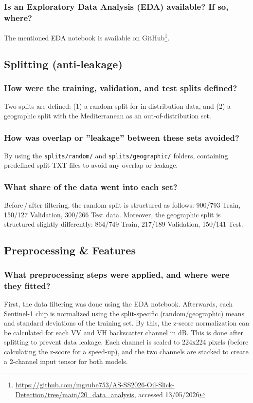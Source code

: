 \documentclass[sigconf]{acmart}
\begin{document}
\subsubsection{Is an Exploratory Data Analysis (EDA) available? If so, where?} The mentioned EDA notebook is available on GitHub\footnote{\url{https://github.com/mgrube753/AS-SS2026-Oil-Slick-Detection/tree/main/20_data_analysis}, accessed 13/05/2026}.

\subsection{Splitting (anti-leakage)}
\subsubsection{How were the training, validation, and test splits defined?} Two splits are defined: (1) a random split for in-distribution data, and (2) a geographic split with the Mediterranean as an out-of-distribution set.
\subsubsection{How was overlap or ''leakage'' between these sets avoided?} By using the \texttt{splits/random/} and \texttt{splits/geographic/} folders, containing predefined split TXT files to avoid any overlap or leakage.
\subsubsection{What share of the data went into each set?} Before\,/\,after filtering, the random split is structured as follows: 900/793 Train, 150/127 Validation, 300/266 Test data. Moreover, the geographic split is structured slightly differently: 864/749 Train, 217/189 Validation, 150/141 Test.
\subsection{Preprocessing \& Features}
\subsubsection{What preprocessing steps were applied, and where were they fitted?} First, the data filtering was done using the EDA notebook. Afterwards, each Sentinel-1 chip is normalized using the split-specific (random/geographic) means and standard deviations of the training set. By this, the z-score normalization can be calculated for each VV and VH backscatter channel in dB. This is done after splitting to prevent data leakage. Each channel is scaled to 224x224 pixels (before calculating the z-score for a speed-up), and the two channels are stacked to create a 2-channel input tensor for both models.
\end{document}

